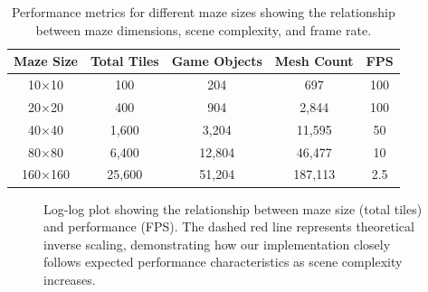 \documentclass{article}
\begin{document}
\begin{table}[H]
    \centering
    \begin{tabular}{|c|c|c|c|c|}
        \hline
        \textbf{Maze Size} & \textbf{Total Tiles} & \textbf{Game Objects} & \textbf{Mesh Count} & \textbf{FPS} \\ \hline
        10×10 & 100 & 204 & 697 & 100 \\ \hline
        20×20 & 400 & 904 & 2,844 & 100 \\ \hline
        40×40 & 1,600 & 3,204 & 11,595 & 50 \\ \hline
        80×80 & 6,400 & 12,804 & 46,477 & 10 \\ \hline
        160×160 & 25,600 & 51,204 & 187,113 & 2.5 \\ \hline
    \end{tabular}
    \caption{Performance metrics for different maze sizes showing the relationship between maze dimensions, scene complexity, and frame rate.}
    \label{tab:maze-performance}
\end{table}

\begin{figure}[H]
    \centering
    \caption{Log-log plot showing the relationship between maze size (total tiles) and performance (FPS). The dashed red line represents theoretical inverse scaling, demonstrating how our implementation closely follows expected performance characteristics as scene complexity increases.}
    \label{fig:performance-scaling}
\end{figure}
\end{document}
